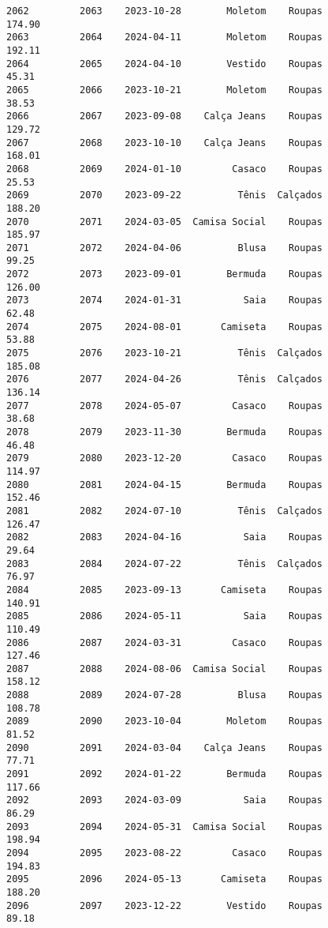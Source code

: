 \documentclass[11pt]{article}
\begin{document}
\begin{Verbatim}[commandchars=\\\{\}]
2062         2063    2023-10-28        Moletom    Roupas          174.90   
2063         2064    2024-04-11        Moletom    Roupas          192.11   
2064         2065    2024-04-10        Vestido    Roupas           45.31   
2065         2066    2023-10-21        Moletom    Roupas           38.53   
2066         2067    2023-09-08    Calça Jeans    Roupas          129.72   
2067         2068    2023-10-10    Calça Jeans    Roupas          168.01   
2068         2069    2024-01-10         Casaco    Roupas           25.53   
2069         2070    2023-09-22          Tênis  Calçados          188.20   
2070         2071    2024-03-05  Camisa Social    Roupas          185.97   
2071         2072    2024-04-06          Blusa    Roupas           99.25   
2072         2073    2023-09-01        Bermuda    Roupas          126.00   
2073         2074    2024-01-31           Saia    Roupas           62.48   
2074         2075    2024-08-01       Camiseta    Roupas           53.88   
2075         2076    2023-10-21          Tênis  Calçados          185.08   
2076         2077    2024-04-26          Tênis  Calçados          136.14   
2077         2078    2024-05-07         Casaco    Roupas           38.68   
2078         2079    2023-11-30        Bermuda    Roupas           46.48   
2079         2080    2023-12-20         Casaco    Roupas          114.97   
2080         2081    2024-04-15        Bermuda    Roupas          152.46   
2081         2082    2024-07-10          Tênis  Calçados          126.47   
2082         2083    2024-04-16           Saia    Roupas           29.64   
2083         2084    2024-07-22          Tênis  Calçados           76.97   
2084         2085    2023-09-13       Camiseta    Roupas          140.91   
2085         2086    2024-05-11           Saia    Roupas          110.49   
2086         2087    2024-03-31         Casaco    Roupas          127.46   
2087         2088    2024-08-06  Camisa Social    Roupas          158.12   
2088         2089    2024-07-28          Blusa    Roupas          108.78   
2089         2090    2023-10-04        Moletom    Roupas           81.52   
2090         2091    2024-03-04    Calça Jeans    Roupas           77.71   
2091         2092    2024-01-22        Bermuda    Roupas          117.66   
2092         2093    2024-03-09           Saia    Roupas           86.29   
2093         2094    2024-05-31  Camisa Social    Roupas          198.94   
2094         2095    2023-08-22         Casaco    Roupas          194.83   
2095         2096    2024-05-13       Camiseta    Roupas          188.20   
2096         2097    2023-12-22        Vestido    Roupas           89.18   

\end{Verbatim}
\end{document}
